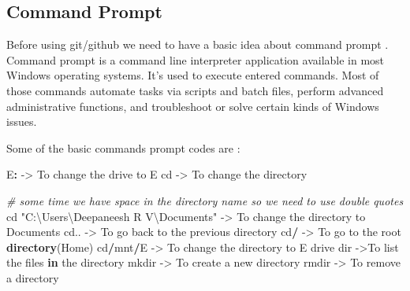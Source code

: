 \documentclass[
]{article}
\newenvironment{Shaded}{\begin{snugshade}}{\end{snugshade}}
\newcommand{\CommentTok}[1]{\textcolor[rgb]{0.56,0.35,0.01}{\textit{#1}}}
\newcommand{\ControlFlowTok}[1]{\textcolor[rgb]{0.13,0.29,0.53}{\textbf{#1}}}
\newcommand{\FunctionTok}[1]{\textcolor[rgb]{0.13,0.29,0.53}{\textbf{#1}}}
\newcommand{\NormalTok}[1]{#1}
\newcommand{\OtherTok}[1]{\textcolor[rgb]{0.56,0.35,0.01}{#1}}
\newcommand{\SpecialCharTok}[1]{\textcolor[rgb]{0.81,0.36,0.00}{\textbf{#1}}}
\newcommand{\StringTok}[1]{\textcolor[rgb]{0.31,0.60,0.02}{#1}}
\begin{document}
\subsection{Command Prompt}\label{command-prompt}

Before using git/github we need to have a basic idea about command
prompt . Command prompt is a command line interpreter application
available in most Windows operating systems. It's used to execute
entered commands. Most of those commands automate tasks via scripts and
batch files, perform advanced administrative functions, and troubleshoot
or solve certain kinds of Windows issues.

Some of the basic commands prompt codes are :

\begin{Shaded}
\begin{Highlighting}[]
\NormalTok{E}\SpecialCharTok{:} \OtherTok{{-}\textgreater{}}\NormalTok{ To change the drive to E}
\NormalTok{cd }\OtherTok{{-}\textgreater{}}\NormalTok{ To change the directory}

\CommentTok{\# some time we have space in the directory name so we need to use double quotes}
\NormalTok{cd }\StringTok{"C:\textbackslash{}Users\textbackslash{}Deepaneesh R V\textbackslash{}Documents"} \OtherTok{{-}\textgreater{}}\NormalTok{ To change the directory to Documents}
\NormalTok{cd.. }\OtherTok{{-}\textgreater{}}\NormalTok{ To go back to the previous directory}
\NormalTok{cd}\SpecialCharTok{/} \OtherTok{{-}\textgreater{}}\NormalTok{ To go to the root }\FunctionTok{directory}\NormalTok{(Home)}
\NormalTok{cd}\SpecialCharTok{/}\NormalTok{mnt}\SpecialCharTok{/}\NormalTok{E }\OtherTok{{-}\textgreater{}}\NormalTok{ To change the directory to E drive }
\NormalTok{dir }\OtherTok{{-}\textgreater{}}\NormalTok{To list the files }\ControlFlowTok{in}\NormalTok{ the directory}
\NormalTok{mkdir }\OtherTok{{-}\textgreater{}}\NormalTok{ To create a new directory}
\NormalTok{rmdir }\OtherTok{{-}\textgreater{}}\NormalTok{ To remove a directory}
\end{Highlighting}
\end{Shaded}
\end{document}
